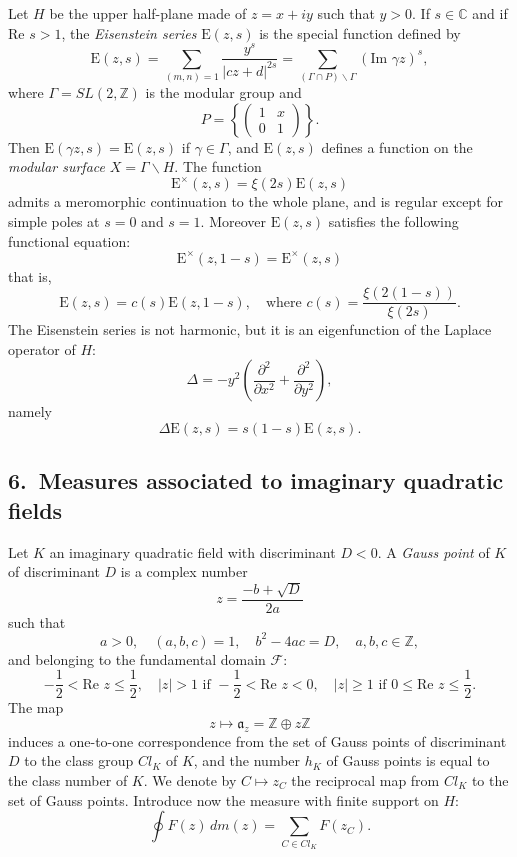 \documentclass[12pt]{article}
\begin{document}
Let $H$ be the upper half-plane made of $z = x + iy$ such that $y > 0$. If $s \in \mathbb{C}$ and if $\text{Re } s > 1$, the \emph{Eisenstein series} $\text{E}(z, s)$ is the special function defined by
\[
\text{E}(z, s) = \sum_{(m,n)=1} \frac{y^s}{|cz+d|^{2s}} = \sum_{(\Gamma \cap P) \backslash \Gamma} (\text{Im } \gamma z)^s,
\]
where $\Gamma = SL(2, \mathbb{Z})$ is the modular group and
\[
P = \left\{ \begin{pmatrix} 1 & x \\ 0 & 1 \end{pmatrix} \right\}.
\]
Then $\text{E}(\gamma z, s) = \text{E}(z, s)$ if $\gamma \in \Gamma$, and $\text{E}(z, s)$ defines a function on the \emph{modular surface} $X = \Gamma \backslash H$. The function
\[
\text{E}^{\times}(z, s) = \xi(2s) \text{E}(z, s)
\]
admits a meromorphic continuation to the whole plane, and is regular except for simple poles at $s = 0$ and $s = 1$. Moreover $\text{E}(z, s)$ satisfies the following functional equation:
\[
\text{E}^{\times}(z, 1-s) = \text{E}^{\times}(z, s)
\]
that is,
\[
\text{E}(z, s) = c(s) \text{E}(z, 1-s), \quad \text{where } c(s) = \frac{\xi(2(1-s))}{\xi(2s)}.
\]
The Eisenstein series is not harmonic, but it is an eigenfunction of the Laplace operator of $H$:
\[
\Delta = -y^2 \left( \frac{\partial^2}{\partial x^2} + \frac{\partial^2}{\partial y^2} \right),
\]
namely
\[
\Delta \text{E}(z, s) = s(1-s) \text{E}(z, s).
\]

\subsection*{6.\ Measures associated to imaginary quadratic fields}

Let $K$ an imaginary quadratic field with discriminant $D < 0$. A \emph{Gauss point} of $K$ of discriminant $D$ is a complex number
\[
z = \frac{-b + \sqrt{D}}{2a}
\]
such that
\[
a > 0, \quad (a, b, c) = 1, \quad b^2 - 4ac = D, \quad a, b, c \in \mathbb{Z},
\]
and belonging to the fundamental domain $\mathcal{F}$:
\[
-\frac{1}{2} < \text{Re } z \leq \frac{1}{2}, \quad |z| > 1 \text{ if } -\frac{1}{2} < \text{Re } z < 0, \quad |z| \geq 1 \text{ if } 0 \leq \text{Re } z \leq \frac{1}{2}.
\]
The map
\[
z \mapsto \mathfrak{a}_z = \mathbb{Z} \oplus z\mathbb{Z}
\]
induces a one-to-one correspondence from the set of Gauss points of discriminant $D$ to the class group $Cl_K$ of $K$, and the number $h_K$ of Gauss points is equal to the class number of $K$. We denote by $C \mapsto z_C$ the reciprocal map from $Cl_K$ to the set of Gauss points. Introduce now the measure with finite support on $H$:
\[
\oint F(z)\,dm(z) = \sum_{C \in Cl_K} F(z_C).
\]
\end{document}
